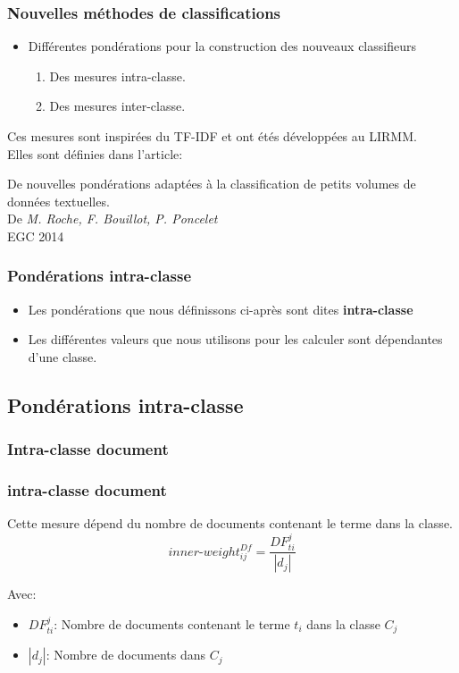 \documentclass[12pt]{beamer}
\begin{document}
\begin{frame}
\frametitle{Nouvelles méthodes de classifications}
\begin{itemize}
\item Différentes pondérations pour la construction des nouveaux classifieurs
\begin{enumerate}
\item Des mesures intra-classe.
\item Des mesures inter-classe.
\end{enumerate}
\end{itemize}
Ces mesures sont inspirées du TF-IDF et ont étés développées au LIRMM.\\
Elles sont définies dans l'article:
\begin{center}
De nouvelles pondérations adaptées à la classification de petits volumes de données textuelles.\\
De \textit{M. Roche, F. Bouillot, P. Poncelet}\\
EGC 2014
\end{center}

\end{frame}

\begin{frame}
\frametitle{Pondérations intra-classe}
\begin{itemize}
\item Les pondérations que nous définissons ci-après sont dites \textbf{intra-classe} 
\item Les différentes valeurs que nous utilisons pour les calculer sont dépendantes d'une classe.
\end{itemize}
\end{frame}

\begin{frame}
\subsection{Pondérations intra-classe}
\frametitle{Intra-classe document}
\subsubsection*{intra-classe document}

Cette mesure dépend du nombre de documents contenant le terme dans la classe.
  \[ inner\mbox{-}weight_{ij}^{Df} = \frac{DF_{ti}^j}{|d_{j}|}\]
  
      Avec:
  \begin{itemize}
  	\item $DF_{ti}^j$: Nombre de documents contenant le terme $t_i$ dans la classe $C_j$	
  	\item $|d_{j}|$: Nombre de documents dans $C_j$	
    \end{itemize}
\end{frame}
\end{document}
